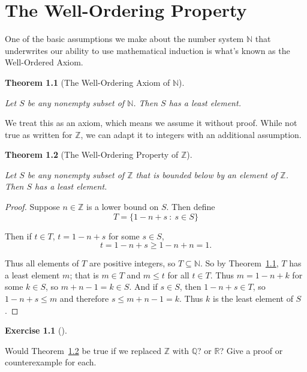 \documentclass[
  letterpaper,
  DIV=11,
  numbers=noendperiod]{scrreprt}
\def\R{\mathbb R}
\def\N{\mathbb N}
\def\Q{\mathbb Q}
\def\Z{\mathbb Z}
\newcommand{\st}{~:~}
\theoremstyle{plain}
\newtheorem{theorem}{Theorem}[chapter]
\theoremstyle{definition}
\newtheorem{exercise}{Exercise}[chapter]
\theoremstyle{plain}
\theoremstyle{plain}
\theoremstyle{definition}
\theoremstyle{definition}
\theoremstyle{remark}
\begin{document}
\chapter{The Well-Ordering Property}\label{sec-wop}

One of the basic assumptions we make about the number system \(\N\) that
underwrites our ability to use mathematical induction is what's known as
the Well-Ordered Axiom.

\begin{theorem}[The Well-Ordering Axiom of
\(\N\)]\protect\hypertarget{thm-ax-wop-n}{}\label{thm-ax-wop-n}

Let \(S\) be any nonempty subset of \(\N\). Then \(S\) has a least
element.

\end{theorem}

We treat this as an axiom, which means we assume it without proof. While
not true as written for \(\Z\), we can adapt it to integers with an
additional assumption.

\begin{theorem}[The Well-Ordering Property of
\(\Z\)]\protect\hypertarget{thm-wop-z}{}\label{thm-wop-z}

Let \(S\) be any nonempty subset of \(\Z\) that is bounded below by an
element of \(\Z\). Then \(S\) has a least element.

\end{theorem}

\begin{proof}
Suppose \(n\in\Z\) is a lower bound on \(S\). Then define
\[T=\{1-n+s\st s\in S\}\]

Then if \(t\in T\), \(t=1-n+s\) for some \(s\in S\),
\[t=1-n+s\geq 1-n+n=1.\]

Thus all elements of \(T\) are positive integers, so \(T\subseteq\N\).
So by Theorem~\ref{thm-ax-wop-n}, \(T\) has a least element \(m\); that
is \(m\in T\) and \(m\leq t\) for all \(t\in T\). Thus \(m=1-n+k\) for
some \(k\in S\), so \(m+n-1=k\in S\). And if \(s\in S\), then
\(1-n+s\in T\), so \(1-n+s\leq m\) and therefore \(s\leq m+n-1=k\). Thus
\(k\) is the least element of \(S\).
\end{proof}

\begin{exercise}[]\protect\hypertarget{exr-wop-for-other-number-systems}{}\label{exr-wop-for-other-number-systems}

Would Theorem~\ref{thm-wop-z} be true if we replaced \(\Z\) with \(\Q\)?
or \(\R\)? Give a proof or counterexample for each.

\end{exercise}
\end{document}
